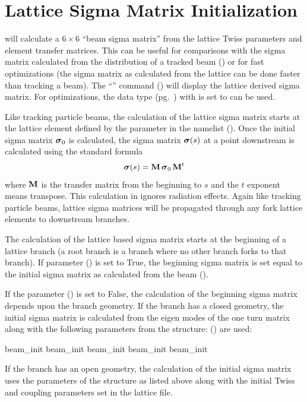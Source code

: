 {{{{{{{{{{{%
\section{Lattice Sigma Matrix Initialization}
\label{s:lat.sig.init}

\tao will calculate a $6\times6$ ``beam sigma matrix'' from the lattice Twiss parameters and element
transfer matrices. This can be useful for comparisons with the sigma matrix calculated from the
distribution of a tracked beam () or for fast optimizations (the sigma matrix as
calculated from the lattice can be done faster than tracking a beam). The ``'' command () will display the lattice derived sigma matrix. For
optimizations, the  data type (pg.~) with  is set to 
can be used.

Like tracking particle beams, the calculation of the lattice sigma matrix starts at the lattice
element defined by the  parameter in the  namelist
(). Once the initial sigma matrix ${\boldsymbol{\sigma}}_0$ is calculated, the sigma matrix
${\boldsymbol{\sigma}}(s)$ at a point downstream is calculated using the standard formula
\begin{equation}
  {\boldsymbol{\sigma}}(s) = {\bf M} \, {\boldsymbol{\sigma}}_0 \, {\bf M}^t
\end{equation}
where ${\bf M}$ is the transfer matrix from the beginning to $s$ and the $t$ exponent means
transpose. This calculation in \tao ignores radiation effects. Again like tracking particle beams,
lattice sigma matrices will be propagated through any fork lattice elements to downstream branches.

The calculation of the lattice based sigma matrix starts at the beginning of a  lattice
branch (a root branch is a branch where no other branch forks to that branch). If 
parameter  () is set to True, the beginning
sigma matrix is set equal to the initial sigma matrix as calculated from the beam
().

If the  parameter  () is set to
False, the calculation of the beginning sigma matrix depends upon the branch geometry.  If the
branch has a closed geometry, the initial sigma matrix is calculated from the eigen modes of the one
turn matrix along with the following parameters from the  structure:
() are used:
\begin{example}
  beam_init%
  beam_init%
  beam_init%
  beam_init%
  beam_init%
\end{example}
If the branch has an open geometry, the calculation of the initial sigma matrix uses the parameters
of the  structure as listed above along with the initial Twiss and coupling parameters
set in the lattice file.

}}}}}}}}}}}
